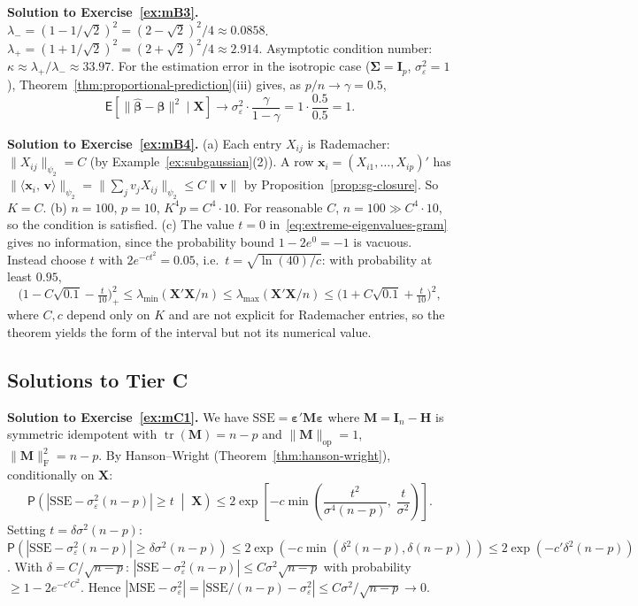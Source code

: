 \documentclass[14pt]{extarticle}
\theoremstyle{plain}
\theoremstyle{definition}
\theoremstyle{remark}
\newcommand\expc{\mathsf{E}}
\newcommand\prb{\mathsf{P}}
\DeclareMathOperator\tr{tr}
\newcommand{\SSE}{\mathrm{SSE}}
\newcommand{\MSE}{\mathrm{MSE}}
\newcommand{\bX}{\mathbf{X}}
\newcommand{\bx}{\mathbf{x}}
\def\bb{\boldsymbol{\beta}}
\newcommand{\be}{\boldsymbol{\varepsilon}}
\newcommand{\bI}{\mathbf{I}}
\newcommand{\bH}{\mathbf{H}}
\newcommand{\bM}{\mathbf{M}}
\newcommand{\bv}{\mathbf{v}}
\newcommand{\bSigma}{\boldsymbol{\Sigma}}
\newcommand{\hbb}{\hat{\boldsymbol{\beta}}}
\newcommand{\ip}[2]{\langle #1,\, #2 \rangle}
\newcommand{\opnorm}[1]{\|#1\|_{\mathrm{op}}}
\newcommand{\fnorm}[1]{\|#1\|_{\mathrm{F}}}
\begin{document}
\textbf{Solution to Exercise~\ref{ex:mB3}.} $\lambda_- = (1 - 1/\sqrt{2})^2 = (2 - \sqrt{2})^2/4 \approx 0.0858$. $\lambda_+ = (1 + 1/\sqrt{2})^2 = (2 + \sqrt{2})^2/4 \approx 2.914$. Asymptotic condition number: $\kappa \approx \lambda_+/\lambda_- \approx 33.97$. For the estimation error in the isotropic case ($\bSigma = \bI_p$, $\sigma_\varepsilon^2 = 1$), Theorem~\ref{thm:proportional-prediction}(iii) gives, as $p/n \to \gamma = 0.5$,
\[
\expc[\|\hbb-\bb\|^2 \mid \bX] \to \sigma_\varepsilon^2\cdot\frac{\gamma}{1-\gamma} = 1\cdot\frac{0.5}{0.5} = 1.
\]

\textbf{Solution to Exercise~\ref{ex:mB4}.} (a) Each entry $X_{ij}$ is Rademacher: $\|X_{ij}\|_{\psi_2} = C$ (by Example~\ref{ex:subgaussian}(2)). A row $\bx_i = (X_{i1}, \ldots, X_{ip})'$ has $\|\ip{\bx_i}{\bv}\|_{\psi_2} = \|\sum_j v_j X_{ij}\|_{\psi_2} \leqslant C\|\bv\|$ by Proposition~\ref{prop:sg-closure}. So $K = C$. (b) $n = 100$, $p = 10$, $K^4 p = C^4 \cdot 10$. For reasonable $C$, $n = 100 \gg C^4 \cdot 10$, so the condition is satisfied. (c) The value $t = 0$ in~\eqref{eq:extreme-eigenvalues-gram} gives no information, since the probability bound $1 - 2e^{0} = -1$ is vacuous. Instead choose $t$ with $2e^{-ct^2} = 0.05$, i.e.\ $t = \sqrt{\ln(40)/c}$: with probability at least $0.95$,
\[
\Big(1 - C\sqrt{0.1} - \tfrac{t}{10}\Big)_+^2 \leqslant \lambda_{\min}(\bX'\bX/n) \leqslant \lambda_{\max}(\bX'\bX/n) \leqslant \Big(1 + C\sqrt{0.1} + \tfrac{t}{10}\Big)^2,
\]
where $C, c$ depend only on $K$ and are not explicit for Rademacher entries, so the theorem yields the form of the interval but not its numerical value.

\subsection*{Solutions to Tier C}

\textbf{Solution to Exercise~\ref{ex:mC1}.} We have $\SSE = \be'\bM\be$ where $\bM = \bI_n - \bH$ is symmetric idempotent with $\tr(\bM) = n - p$ and $\opnorm{\bM} = 1$, $\fnorm{\bM}^2 = n - p$. By Hanson--Wright (Theorem~\ref{thm:hanson-wright}), conditionally on $\bX$:
\[
\prb\!\left(|\SSE - \sigma_\varepsilon^2(n-p)| \geqslant t \;\middle|\; \bX\right) \leqslant 2\exp\!\left[-c\min\!\left(\frac{t^2}{\sigma^4(n-p)},\; \frac{t}{\sigma^2}\right)\right].
\]
Setting $t = \delta\sigma^2(n-p)$: $\prb(|\SSE - \sigma_\varepsilon^2(n-p)| \geqslant \delta\sigma^2(n-p)) \leqslant 2\exp(-c\min(\delta^2(n-p), \delta(n-p))) \leqslant 2\exp(-c'\delta^2(n-p))$. With $\delta = C/\sqrt{n-p}$: $|\SSE - \sigma_\varepsilon^2(n-p)| \leqslant C\sigma^2\sqrt{n-p}$ with probability $\geqslant 1 - 2e^{-c'C^2}$. Hence $|\MSE - \sigma_\varepsilon^2| = |\SSE/(n-p) - \sigma_\varepsilon^2| \leqslant C\sigma^2/\sqrt{n-p} \to 0$.
\end{document}
